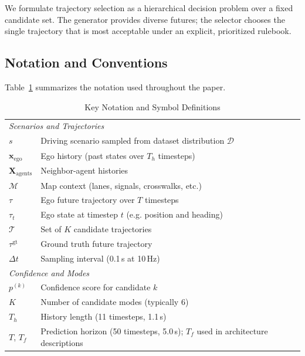 We formulate trajectory selection as a hierarchical decision problem over a fixed candidate set. The generator provides diverse futures; the selector chooses the single trajectory that is most acceptable under an explicit, prioritized rulebook.

\subsection{Notation and Conventions}
\label{subsec:notation}

Table~\ref{tab:notation} summarizes the notation used throughout the paper.

\begin{table}
\centering
\small
\caption{Key Notation and Symbol Definitions}
\label{tab:notation}
\begin{tabular}{ll}
\toprule
\multicolumn{2}{l}{\textit{Scenarios and Trajectories}} \\
$s$ & Driving scenario sampled from dataset distribution $\mathcal{D}$ \\
$\mathbf{x}_{\text{ego}}$ & Ego history (past states over $T_h$ timesteps) \\
$\mathbf{X}_{\text{agents}}$ & Neighbor-agent histories \\
$\mathcal{M}$ & Map context (lanes, signals, crosswalks, etc.) \\
$\tau$ & Ego future trajectory over $T$ timesteps \\
$\tau_t$ & Ego state at timestep $t$ (e.g. position and heading) \\
$\mathcal{T}$ & Set of $K$ candidate trajectories \\
$\tau^{\mathrm{gt}}$ & Ground truth future trajectory \\
$\Delta t$ & Sampling interval (0.1\,s at 10\,Hz) \\
\midrule
\multicolumn{2}{l}{\textit{Confidence and Modes}} \\
$p^{(k)}$ & Confidence score for candidate $k$ \\
$K$ & Number of candidate modes (typically 6) \\
$T_h$ & History length (11 timesteps, 1.1\,s) \\
$T$, $T_f$ & \shortstack{Prediction horizon (50 timesteps, 5.0\,s);\\ $T_f$ used in architecture descriptions} \\

\end{tabular}
\end{table}
